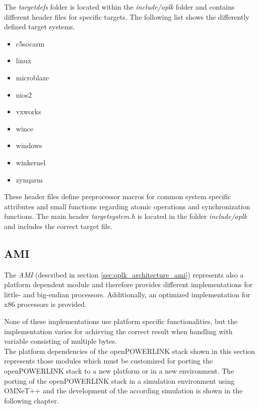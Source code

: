 \begin{description}[leftmargin=1cm]
    \item[targetdefs] The \emph{targetdefs} folder is located within the \emph{include/oplk} folder and contains different header files for specific targets.
    The following list shows the differently defined target systems.
    \begin{multicols}{3}
        \begin{itemize}
            \item c5socarm
            \item linux
            \item microblaze
            \item nios2
            \item vxworks
            \item wince
            \item windows
            \item winkernel
            \item zynqarm
        \end{itemize}
    \end{multicols}
    These header files define preprocessor macros for common system specific attributes and small functions regarding atomic operations and synchronization functions.
    The main header \emph{targetsystem.h} is located in the folder \emph{include/oplk} and includes the correct target file. \\
    
        
\end{description}

\subsection{AMI}
\label{sec:oplk_platform_ami}

The \emph{AMI} (described in section \ref{sec:oplk_architecture_ami}) represents also a platform dependent module and therefore provides different implementations for little- and big-endian processors.
Additionally, an optimized implementation for x86 processors is provided.

None of these implementations use platform specific functionalities, but the implementation varies for achieving the correct result when handling with variable consisting of multiple bytes.
\\

The platform dependencies of the openPOWERLINK stack shown in this section represents those modules which must be customized for porting the openPOWERLINK stack to a new platform or in a new environment.
The porting of the openPOWERLINK stack in a simulation environment using OMNeT++ and the development of the according simulation is shown in the following chapter.